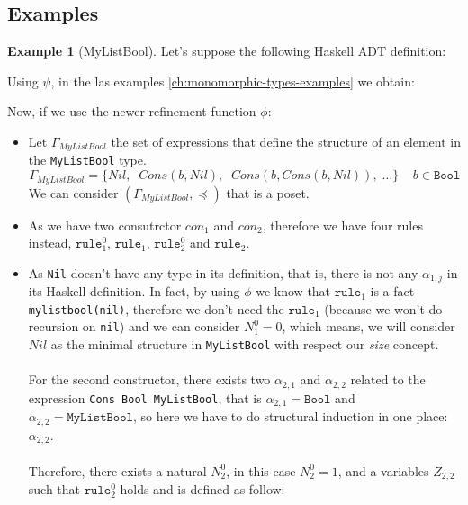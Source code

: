 \documentclass{report}
\theoremstyle{definition}
\newtheorem{example}{Example}[section]
\theoremstyle{definition}
\newcommand{\ttt}[1]{\texttt{#1}}
\newcommand{\tav}{\;\;}
\begin{document}
	\subsection{Examples} \label{ch:monomorphic-bounded-types-examples}
	\begin{example}[MyListBool]
		Let's suppose the following Haskell ADT definition:
		
		Using $\psi$, in the las examples \ref{ch:monomorphic-types-examples} we obtain:
		
		Now, if we use the newer refinement function $\phi$:
		\begin{itemize}
			\item Let $\Gamma_{MyListBool}$ the set of expressions that define the structure of an element in the \ttt{MyListBool} type. $$\Gamma_{MyListBool} = \{ Nil, \tav Cons(b, Nil), \tav Cons(b, Cons(b, Nil)), \; \ldots \} \tav \tav b \in \ttt{Bool}$$
			      We can consider $(\Gamma_{MyListBool}, \preceq)$ that is a poset.
			\item As we have two consutrctor $con_1$ and $con_2$, therefore we have four rules instead, $\ttt{rule}_{1}^{0}$, $\ttt{rule}_1$, $\ttt{rule}_{2}^{0}$ and $\ttt{rule}_2$.
			\item As \ttt{Nil} doesn't have any type in its definition, that is, there is not any $\alpha_{1,j}$ in its Haskell definition. In fact, by using $\phi$ we know that $\ttt{rule}_1$ is a fact \ttt{mylistbool(nil)}, therefore we don't need the $\ttt{rule}_1$ (because we won't do recursion on \ttt{nil}) and we can consider $N_{1}^{0} = 0$, which means, we will consider $Nil$ as the minimal structure in \ttt{MyListBool} with respect our \textit{size} concept.\\\\
			      For the second constructor, there exists two $\alpha_{2,1}$ and $\alpha_{2,2}$ related to the expression \ttt{Cons Bool MyListBool}, that is $\alpha_{2,1} = \ttt{Bool}$ and $\alpha_{2,2} = \ttt{MyListBool}$, so here we have to do structural induction in one place: $\alpha_{2,2}$.\\\\
			      Therefore, there exists a natural $N_{2}^{0}$, in this case $N_{2}^{0} = 1$, and a variables $Z_{2,2}$ such that $\ttt{rule}_{2}^{0}$ holds and is defined as follow:
			      \begin{flalign*}

\end{flalign*}
\end{itemize}
\end{example}
\end{document}
